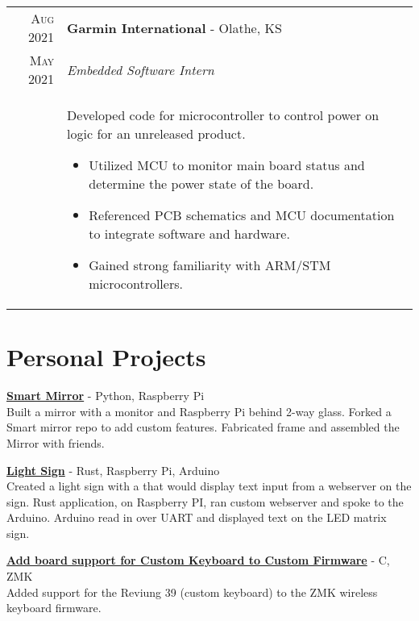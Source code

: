 \documentclass[a4paper,11pt]{article}
\begin{document}
%
%
\begin{tabularx}{\textwidth}{r|X}
   \textsc{Aug 2021} & \textbf{Garmin International} \-- Olathe, KS\\
   \textsc{May 2021} & \emph{Embedded Software Intern}\\
   & \small{Developed code for microcontroller to control power on logic for an unreleased product.
      \begin{itemize}[leftmargin=20pt,topsep=1pt,itemsep=1pt,partopsep=0pt, parsep=1pt]
        \item Utilized MCU to monitor main board status and determine the power state of the board.
        \item Referenced PCB schematics and MCU documentation to integrate software and hardware.
        \item Gained strong familiarity with ARM/STM microcontrollers.
      \vspace{-0.5cm}
      \end{itemize}}\\
\end{tabularx}

\section{Personal Projects}

   \small{\textbf{\href{https://github.com/ajone239/smartmirror}{Smart Mirror}} \-- Python, Raspberry Pi\\
          Built a mirror with a monitor and Raspberry Pi behind 2-way glass.
          Forked a Smart mirror repo to add custom features.
          Fabricated frame and assembled the Mirror with friends.
          }

   \small{\textbf{\href{https://github.com/ajone239/light_sign}{Light Sign}} \-- Rust, Raspberry Pi, Arduino\\
          Created a light sign with a that would display text input from a webserver on the sign.
          Rust application, on Raspberry PI, ran custom webserver and spoke to the Arduino.
          Arduino read in over UART and displayed text on the LED matrix sign.
          }

   \small{\textbf{\href{https://github.com/zmkfirmware/zmk/pull/795}{Add board support for Custom Keyboard to Custom Firmware}} \-- C, ZMK\\
          Added support for the Reviung 39 (custom keyboard) to the ZMK wireless keyboard firmware.
          }
\end{document}
